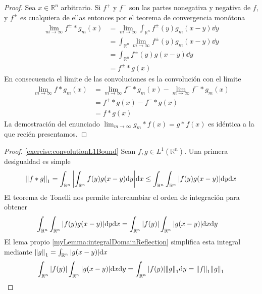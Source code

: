 \documentclass{article}
\newcommand{\realNumbers}{\mathbb{R}}
\newcommand{\integrableFunctions}{L^1(\realNumbers^n)}
\theoremstyle{remark}
\begin{document}
  \begin{proof}
    Sea \(x \in \realNumbers^n\) arbitrario.
    Si \(f^+\) y \(f^-\) son las partes nonegativa y negativa de \(f\), y \(f^{\pm}\) es cualquiera de ellas entonces por el teorema de convergencia monótona
    \begin{align}
      \lim_{m \rightarrow \infty} f^{\pm} * g_m (x)
      &=
      \lim_{m \rightarrow \infty} \int_{\realNumbers^n} f^{\pm}(y)  g_m (x - y) \dd y
      \\
      &=
      \int_{\realNumbers^n} \lim_{m \rightarrow \infty} f^{\pm}(y)  g_m (x - y) \dd y
      \\
      &=
      \int_{\realNumbers^n} f^{\pm}(y) g(x - y) \dd y
      \\
      &=
      f^{\pm} * g (x)
    \end{align}
    En consecuencia el límite de las convoluciones es la convolución con el límite
    \begin{align}
      \lim_{m \rightarrow \infty} 
        f * g_m (x)
      &=
      \lim_{m \rightarrow \infty}
        f^+ * g_m (x)
      - \lim_{m \rightarrow \infty}
        f^- * g_m (x)
      \\
      &=
      f^+ * g (x) - f^- * g (x)
      \\
      &=
      f * g (x)
    \end{align}
    La demostración del enunciado
    \(
      \lim_{m \rightarrow \infty} 
        g_m * f (x)
      =
      g * f (x)
    \)
    es idéntica a la que recién presentamos.
  \end{proof}

  \begin{proof}
    \ref{exercise:convolutionL1Bound}
    Sean \(f, g \in \integrableFunctions\).
    Una primera desigualdad es simple
    \begin{align}
      \norm{f * g}_1
      =
      \int_{\realNumbers^n} \abs{\int_{\realNumbers^n} f(y) g(x - y) \dd y} \dd x
      \leq
      \int_{\realNumbers^n} \int_{\realNumbers^n} \abs{f(y) g(x - y)} \dd y \dd x
    \end{align}
    El teorema de Tonelli nos permite intercambiar el orden de integración para obtener
    \begin{align}
      \int_{\realNumbers^n} \int_{\realNumbers^n} \abs{f(y) g(x - y)} \dd y \dd x
      &=
      \int_{\realNumbers^n} \abs{f(y)} \int_{\realNumbers^n} \abs{g(x - y)} \dd x \dd y
    \end{align}
    El lema propio \ref{myLemma:integralDomainReflection} simplifica esta integral mediante \(\norm{g}_1 = \int_{\realNumbers^n} \abs{g(x - y)} \dd x\)
    \begin{align}
      \int_{\realNumbers^n} \abs{f(y)} \int_{\realNumbers^n} \abs{g(x - y)} \dd x \dd y
      =
      \int_{\realNumbers^n} \abs{f(y)} \norm{g}_1 \dd y
      =
      \norm{f}_1 \norm{g}_1
    \end{align}
    
  \end{proof}
\end{document}
